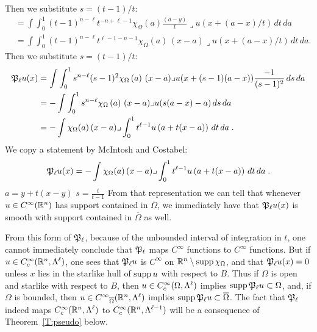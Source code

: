 \documentclass[a4paper]{article}
\begin{document}
Then we substitute $s = (t-1)/t$:
\begin{align*}
    &= 
    \int \int_{0}^{1} (t-1)^{n-\ell}t^{-n+\ell-1} 
    \chi_{\Omega}\left(a\right)
    \frac{(a-y)}{t} \lrcorner u(x+(a-x)/t) \,dt\,da 
    \\
    &= 
    \int \int_{0}^{1} (t-1)^{n-\ell}t^{\ell-1-n-1} \chi_{\Omega}\left(a\right)\, (x-a)\lrcorner u(x+(a-x)/t) \,dt\,da
    .
\end{align*}
Then we substitute $s = (t-1)/t$:
\begin{align*}
    {\mathfrak P}_{\ell} u(x) 
    &= 
    \int \int_{0}^{1} s^{n-\ell} (s-1)^{2} \chi_{\Omega}\left(a\right)\, (x-a)\lrcorner u( x+(s-1)(a-x) ) \frac{-1}{(s-1)^2}\,ds\,da
    \\
    &= 
    - \int \int_{0}^{1} s^{n-\ell} \chi_{\Omega}\left(a\right)\, (x-a)\lrcorner u( s(a-x) - a ) \,ds\,da
    \\
    &=
    - \int \chi_{\Omega}(a) \,(x-a)\lrcorner \int_{0}^{1} t^{\ell-1} u\left(a+t(x-a)\right)\,dt\,da\;
    .
\end{align*}
We copy a statement by McIntosh and Costabel:
\begin{align*}
    {\mathfrak P}_{\ell} u(x) 
    = 
    - \int \chi_{\Omega}(a) \,(x-a)\lrcorner \int_{0}^{1} t^{\ell-1} u\left(a+t(x-a)\right)\,dt\,da\;
    .
\end{align*}
$a = y + t(x-y)$
$s = \frac{t}{t-1}$
From that representation we can tell that whenever $u \in C^{\infty}({\mathbb R}^{n})$ has support contained in $\overline\Omega$, we immediately have that ${\mathfrak P}_{\ell} u(x)$ is smooth with support contained in $\overline\Omega$ as well. 











From this form of ${\mathfrak P}_{\ell}$, because of the unbounded interval of integration in $t$, one cannot immediately conclude that ${\mathfrak P}_{\ell}$ maps ${C^\infty}$ functions to ${C^\infty}$ functions.
But if $u\in{C^\infty_c}({\mathbb R}^n,\Lambda^\ell)$, one sees that ${\mathfrak P}_{\ell} u$ is ${C^\infty}$ on 
${\mathbb R}^n\setminus\operatorname{supp}\chi_{\Omega}$, and that 
${\mathfrak P}_{\ell} u(x)=0$ unless $x$ lies in the starlike hull of $\operatorname{supp} u$ with respect to $B$. 
Thus if $\Omega$ is open and starlike with respect to $B$, then   
$u\in{C^\infty_c}(\Omega,\Lambda^\ell)$ implies $\operatorname{supp} {\mathfrak P}_{\ell} u \subset\Omega$, and, if $\Omega$ is bounded, then
$u\in{C^\infty}_{\overline\Omega}({\mathbb R}^n,\Lambda^\ell)$ implies $\operatorname{supp} {\mathfrak P}_{\ell} u \subset\overline\Omega$. 
The fact that ${\mathfrak P}_{\ell}$ indeed maps 
${C^\infty_c}({\mathbb R}^n,\Lambda^\ell)$ to ${C^\infty_c}({\mathbb R}^n,\Lambda^{\ell-1})$ will be a consequence of Theorem~\ref{T:pseudo} below.
\end{document}
